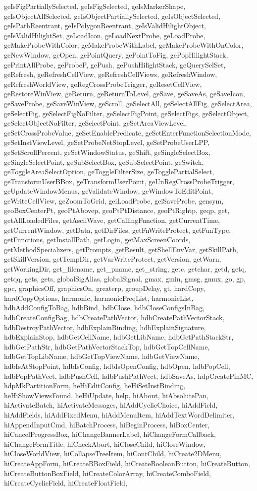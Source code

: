 {{geIsFigPartiallySelected, geIsFigSelected, geIsMarkerShape, geIsObjectAllSelected, geIsObjectPartiallySelected, geIsObjectSelected, geIsPathReentrant, geIsPolygonReentrant, geIsValidHilightObject, geIsValidHilightSet, geLoadIcon, geLoadNextProbe, geLoadProbe, geMakeProbeWithColor, geMakeProbeWithLabel, geMakeProbeWithOnColor, geNewWindow, geOpen, gePointQuery, gePointToFig, gePopHilightStack, gePrintAllProbe, geProbeP, gePush, gePushHilightStack, geQuerySelSet, geRefresh, geRefreshCellView, geRefreshCellViews, geRefreshWindow, geRefreshWorldView, geRegCrossProbeTrigger, geResetCellView, geRestoreWinView, geReturn, geReturnToLevel, geSave, geSaveAs, geSaveIcon, geSaveProbe, geSaveWinView, geScroll, geSelectAll, geSelectAllFig, geSelectArea, geSelectFig, geSelectFigNoFilter, geSelectFigPoint, geSelectFigs, geSelectObject, geSelectObjectNoFilter, geSelectPoint, geSetAreaViewLevel, geSetCrossProbeValue, geSetEnablePredicate, geSetEnterFunctionSelectionMode, geSetInstViewLevel, geSetProbeNetStopLevel, geSetProbeUserLPP, geSetScrollPercent, geSetWindowStatus, geShift, geSingleSelectBox, geSingleSelectPoint, geSubSelectBox, geSubSelectPoint, geSwitch, geToggleAreaSelectOption, geToggleFilterSize, geTogglePartialSelect, geTransformUserBBox, geTransformUserPoint, geUnRegCrossProbeTrigger, geUpdateWindowMenus, geValidateWindow, geWindowToEditPoint, geWriteCellView, geZoomToGrid, geiLoadProbe, geiSaveProbe, gensym, geoBoxCenterPt, geoPtAbovep, geoPtPtDistance, geoPtRightp, geqp, get, getAllLoadedFiles, getAsciiWave, getCallingFunction, getCurrentTime, getCurrentWindow, getData, getDirFiles, getFnWriteProtect, getFunType, getFunctions, getInstallPath, getLogin, getMaxScreenCoords, getMethodSpecializers, getPrompts, getResult, getShellEnvVar, getSkillPath, getSkillVersion, getTempDir, getVarWriteProtect, getVersion, getWarn, getWorkingDir, get_filename, get_pname, get_string, getc, getchar, getd, getq, getqq, gets, gets, globalSigAlias, globalSignal, gmax, gmin, gmsg, gmux, go, gp, gpc, graphicsOff, graphicsOn, greaterp, groupDelay, gt, hardCopy, hardCopyOptions, harmonic, harmonicFreqList, harmonicList, hdbAddConfigToBag, hdbBind, hdbClose, hdbCloseConfigsInBag, hdbCreateConfigBag, hdbCreatePathVector, hdbCreatePathVectorStack, hdbDestroyPathVector, hdbExplainBinding, hdbExplainSignature, hdbExplainStop, hdbGetCellName, hdbGetLibName, hdbGetPathStackStr, hdbGetPathStr, hdbGetPathVectorStackTop, hdbGetTopCellName, hdbGetTopLibName, hdbGetTopViewName, hdbGetViewName, hdbIsAtStopPoint, hdbIsConfig, hdbIsOpenConfig, hdbOpen, hdbPopCell, hdbPopPathVect, hdbPushCell, hdbPushPathVect, hdbSaveAs, hdpCreatePinMC, hdpMkPartitionForm, heHiEditConfig, heHiSetInstBinding, heHiShowViewsFound, heHiUpdate, help, hiAbout, hiAbsolutePan, hiActivateBatch, hiActivateMessages, hiAddCyclicChoice, hiAddField, hiAddFields, hiAddFixedMenu, hiAddMenuItem, hiAddTextWordDelimiter, hiAppendInputCmd, hiBatchProcess, hiBeginProcess, hiBoxCenter, hiCancelProgressBox, hiChangeBannerLabel, hiChangeFormCallback, hiChangeFormTitle, hiCheckAbort, hiCloseChild, hiCloseWindow, hiCloseWorldView, hiCollapseTreeItem, hiContChild, hiCreate2DMenu, hiCreateAppForm, hiCreateBBoxField, hiCreateBooleanButton, hiCreateButton, hiCreateButtonBoxField, hiCreateColorArray, hiCreateComboField, hiCreateCyclicField, hiCreateFloatField, }}
